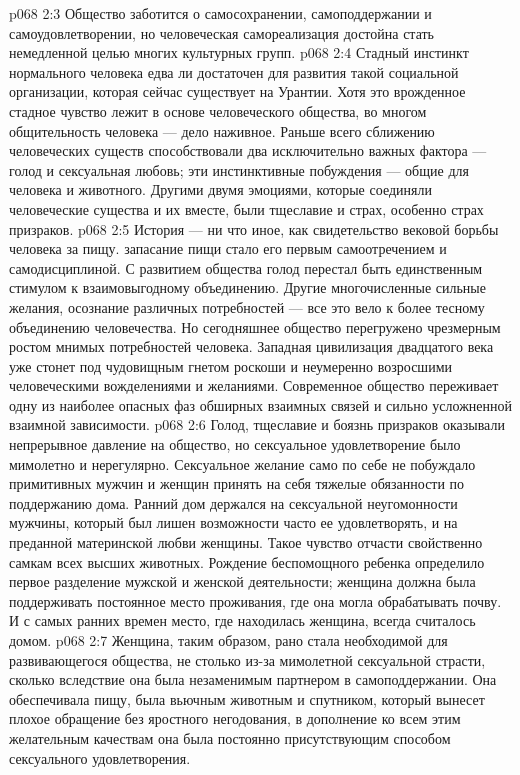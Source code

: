 \vs p068 2:3 Общество заботится о самосохранении, самоподдержании и самоудовлетворении, но человеческая самореализация достойна стать немедленной целью многих культурных групп.
\vs p068 2:4 Стадный инстинкт нормального человека едва ли достаточен для развития такой социальной организации, которая сейчас существует на Урантии. Хотя это врожденное стадное чувство лежит в основе человеческого общества, во многом общительность человека --- дело наживное. Раньше всего сближению человеческих существ способствовали два исключительно важных фактора --- голод и сексуальная любовь; эти инстинктивные побуждения --- общие для человека и животного. Другими двумя эмоциями, которые соединяли человеческие существа и  их вместе, были тщеславие и страх, особенно страх призраков.
\vs p068 2:5 \pc История --- ни что иное, как свидетельство вековой борьбы человека за пищу.  запасание пищи стало его первым самоотречением и самодисциплиной. С развитием общества голод перестал быть единственным стимулом к взаимовыгодному объединению. Другие многочисленные сильные желания, осознание различных потребностей --- все это вело к более тесному объединению человечества. Но сегодняшнее общество перегружено чрезмерным ростом мнимых потребностей человека. Западная цивилизация двадцатого века уже стонет под чудовищным гнетом роскоши и неумеренно возросшими человеческими вожделениями и желаниями. Современное общество переживает одну из наиболее опасных фаз обширных взаимных связей и сильно усложненной взаимной зависимости.
\vs p068 2:6 Голод, тщеславие и боязнь призраков оказывали непрерывное давление на общество, но сексуальное удовлетворение было мимолетно и нерегулярно. Сексуальное желание само по себе не побуждало примитивных мужчин и женщин принять на себя тяжелые обязанности по поддержанию дома. Ранний дом держался на сексуальной неугомонности мужчины, который был лишен возможности часто ее удовлетворять, и на преданной материнской любви женщины. Такое чувство отчасти свойственно самкам всех высших животных. Рождение беспомощного ребенка определило первое разделение мужской и женской деятельности; женщина должна была поддерживать постоянное место проживания, где она могла обрабатывать почву. И с самых ранних времен место, где находилась женщина, всегда считалось домом.
\vs p068 2:7 Женщина, таким образом, рано стала необходимой для развивающегося общества, не столько из\hyp{}за мимолетной сексуальной страсти, сколько вследствие  она была незаменимым партнером в самоподдержании. Она обеспечивала пищу, была вьючным животным и спутником, который вынесет плохое обращение без яростного негодования, в дополнение ко всем этим желательным качествам она была постоянно присутствующим способом сексуального удовлетворения.
